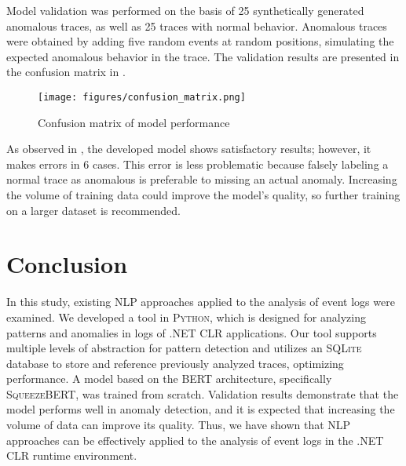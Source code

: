\documentclass[sigplan,nonacm]{acmart}
\begin{document}
Model validation was performed on the basis of 25 synthetically generated anomalous traces, as well as 25 traces with normal behavior. Anomalous traces were obtained by adding five random events at random positions, simulating the expected anomalous behavior in the trace. The validation results are presented in the confusion matrix in .

\begin{figure}
\texttt{[image: figures/confusion\_matrix.png]}
\caption{Confusion matrix of model performance}
\Description{}
\label{fig:confusion_matrix}
\end{figure}

As observed in , the developed model shows satisfactory results; however, it makes errors in 6 cases. This error is less problematic because falsely labeling a normal trace as anomalous is preferable to missing an actual anomaly. Increasing the volume of training data could improve the model's quality, so further training on a larger dataset is recommended.

\section{Conclusion}\label{sec:conclusion}

In this study, existing NLP approaches applied to the analysis of event logs were examined. We developed a tool in \textsc{Python}, which is designed for analyzing patterns and anomalies in logs of .NET CLR applications. Our tool supports multiple levels of abstraction for pattern detection and utilizes an \textsc{SQLite} database to store and reference previously analyzed traces, optimizing performance. A model based on the \textsc{BERT} architecture, specifically \textsc{SqueezeBERT}, was trained from scratch. Validation results demonstrate that the model performs well in anomaly detection, and it is expected that increasing the volume of data can improve its quality. Thus, we have shown that NLP approaches can be effectively applied to the analysis of event logs in the .NET CLR runtime environment.



\end{document}
